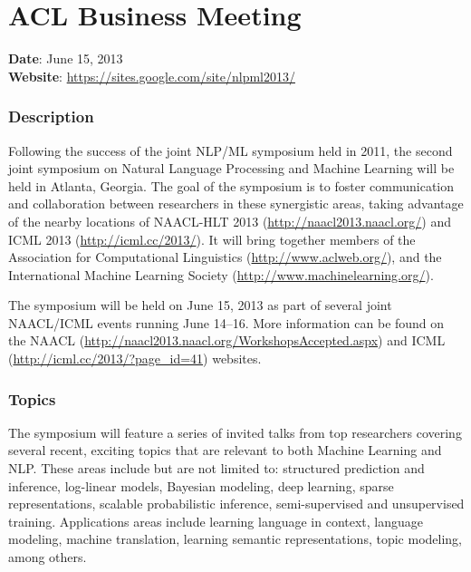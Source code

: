 \vspace*{-3cm}\par
\chapter[ACL Business Meeting]{ACL Business Meeting}
\thispagestyle{emptyheader}

\textbf{Date}: June 15, 2013 \\
\textbf{Website}: \url{https://sites.google.com/site/nlpml2013/}

\subsection*{Description}

Following the success of the joint NLP/ML symposium held in 2011, the second joint symposium on
Natural Language Processing and Machine Learning will be held in Atlanta, Georgia. The goal of the
symposium is to foster communication and collaboration between researchers in these synergistic
areas, taking advantage of the nearby locations of NAACL-HLT 2013
(\url{http://naacl2013.naacl.org/}) and ICML 2013 (\url{http://icml.cc/2013/}). It will bring
together members of the Association for Computational Linguistics (\url{http://www.aclweb.org/}),
and the International Machine Learning Society (\url{http://www.machinelearning.org/}).

The symposium will be held on June 15, 2013 as part of several joint NAACL/ICML events running June
14--16. More information can be found on the NAACL
(\url{http://naacl2013.naacl.org/WorkshopsAccepted.aspx}) and ICML
(\url{http://icml.cc/2013/?page_id=41}) websites.

\subsection*{Topics}

The symposium will feature a series of invited talks from top researchers covering several recent,
exciting topics that are relevant to both Machine Learning and NLP. These areas include but are not
limited to: structured prediction and inference, log-linear models, Bayesian modeling, deep
learning, sparse representations, scalable probabilistic inference, semi-supervised and unsupervised
training. Applications areas include learning language in context, language modeling, machine
translation, learning semantic representations, topic modeling, among others.

